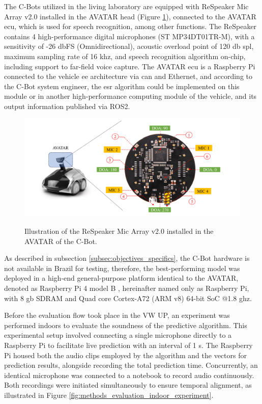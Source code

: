 The C-Bots utilized in the living laboratory are equipped with ReSpeaker Mic Array v2.0 \cite{ReSpeake72} installed in the AVATAR head (Figure \ref{fig:methods_evaluation_AVATAR_ReSpeaker}), connected to the AVATAR \gls{ecu}, which is used for speech recognition, among other functions. The ReSpeaker contains 4 high-performance digital microphones (ST MP34DT01TR-M), with a sensitivity of -26 \gls{db}FS (Omnidirectional), acoustic overload point of 120 \gls{db} \gls{spl}, maximum sampling rate of 16 \gls{k}\gls{hz}, and speech recognition algorithm on-chip, including support to far-field voice capture. The AVATAR \gls{ecu} is a Raspberry Pi connected to the vehicle \gls{ee} architecture via \gls{can} and Ethernet, and according to the C-Bot system engineer, the \gls{esr} algorithm could be implemented on this module or in another high-performance computing module of the vehicle, and its output information published via ROS2. 

\begin{figure}[htbp]
    \raggedright
        \caption{Illustration of the ReSpeaker Mic Array v2.0 installed in the AVATAR of the C-Bot.}
        \includegraphics[width=.85\textwidth]{resources/images/050-methods/Methods_evaluation_microphone_ReSpeaker_Mic_Array_v2.0.png}
        \label{fig:methods_evaluation_AVATAR_ReSpeaker}
\end{figure}

As described in subsection \ref{subsec:objectives_specifics}, the C-Bot hardware is not available in Brazil for testing, therefore, the best-performing model was deployed in a high-end general-purpose platform identical to the AVATAR, denoted as Raspberry Pi 4 model B \cite{Raspberry2023}, hereinafter named only as Raspberry Pi, with 8 \gls{g}\gls{b} SDRAM and Quad core Cortex-A72 (ARM v8) 64-bit SoC @1.8 \gls{g}\gls{hz}. 

Before the evaluation flow took place in the VW UP, an experiment was performed indoors to evaluate the soundness of the predictive algorithm. This experimental setup involved connecting a single microphone directly to a Raspberry Pi to facilitate live prediction with an interval of 1 \gls{s}. The Raspberry Pi housed both the audio clips employed by the algorithm and the vectors for prediction results, alongside recording the total prediction time. Concurrently, an identical microphone was connected to a notebook to record audio continuously. Both recordings were initiated simultaneously to ensure temporal alignment, as illustrated in Figure \ref{fig:methods_evaluation_indoor_experiment}.

